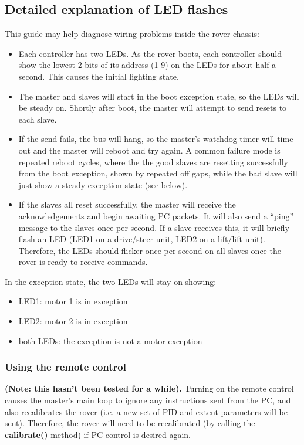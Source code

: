 \subsection{Detailed explanation of LED flashes}
This guide may help diagnose wiring problems inside the rover chassis:
\begin{itemize}
\item Each controller has two LEDs. As the rover boots, each controller
should show the lowest 2 bits of its \isqc{} address (1-9) on the LEDs
for about half a second. This causes the initial lighting state.
\item The master and slaves will start in the boot exception state,
so the LEDs will be steady on. Shortly after boot, the master will attempt to send
resets to each slave. 
\item If the send fails, the \isqc{} bus will hang, so the master's
watchdog timer will time out and the master will reboot and try again. A
common failure mode is repeated reboot cycles, where the the good slaves
are resetting successfully from the boot exception, shown by repeated off
gaps, while the bad slave will just show a steady exception state (see
below).
\item If the slaves all reset successfully, the master will receive
the acknowledgements and begin awaiting PC packets. It will also
send a ``ping'' message to the slaves once per second. If a slave receives
this, it will briefly flash an LED (LED1 on a drive/steer unit,
LED2 on a lift/lift unit). Therefore, the LEDs should flicker once per
second on all slaves once the rover is ready to receive commands.
\end{itemize}

In the exception state, the two LEDs will stay on showing:
\begin{itemize}
\item LED1: motor 1 is in exception
\item LED2: motor 2 is in exception
\item both LEDs: the exception is not a motor exception
\end{itemize}

\subsubsection{Using the remote control}
\textbf{(Note: this hasn't been tested for a while).}
Turning on the remote control causes the master's main loop to ignore any
instructions sent from the PC, and also recalibrates the rover (i.e. a new
set of PID and extent parameters will be sent). Therefore, the rover will
need to be recalibrated (by calling the \textbf{calibrate()} method) if
PC control is desired again.


